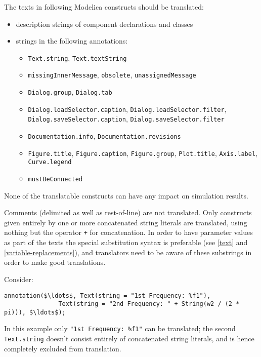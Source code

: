 The texts in following Modelica constructs should be translated:
\begin{itemize}
\item description strings of component declarations and classes
\item strings in the following annotations:
\begin{itemize}
\item \lstinline!Text.string!, \lstinline!Text.textString!
\item \lstinline!missingInnerMessage!, \lstinline!obsolete!, \lstinline!unassignedMessage!
\item \lstinline!Dialog.group!, \lstinline!Dialog.tab!
\item
  \lstinline!Dialog.loadSelector.caption!, \lstinline!Dialog.loadSelector.filter!,
  \ifpdf\\\else\fi%
  \lstinline!Dialog.saveSelector.caption!, \lstinline!Dialog.saveSelector.filter!
\item \lstinline!Documentation.info!, \lstinline!Documentation.revisions!
\item \lstinline!Figure.title!, \lstinline!Figure.caption!, \lstinline!Figure.group!, \lstinline!Plot.title!, \lstinline!Axis.label!, \lstinline!Curve.legend!
\item \lstinline!mustBeConnected!
\end{itemize}
\end{itemize}

\begin{nonnormative}
None of the translatable constructs can have any impact on simulation results.
\end{nonnormative}

Comments (delimited as well as rest-of-line) are not translated.
Only constructs given entirely by one or more concatenated string literals are translated, using nothing but the operator \lstinline!+! for concatenation.
In order to have parameter values as part of the texts the special substitution syntax is preferable (see \cref{text} and \cref{variable-replacements}), and translators need to be aware of these substrings in order to make good translations.

\begin{example}
Consider:
\begin{lstlisting}[language=modelica]
annotation($\ldots$, Text(string = "1st Frequency: %f1"),
               Text(string = "2nd Frequency: " + String(w2 / (2 * pi))), $\ldots$);
\end{lstlisting}
In this example only \lstinline!"1st Frequency: %f1"! can be translated; the second \lstinline!Text.string! doesn't consist entirely of concatenated string literals, and is hence completely excluded from translation.
\end{example}

